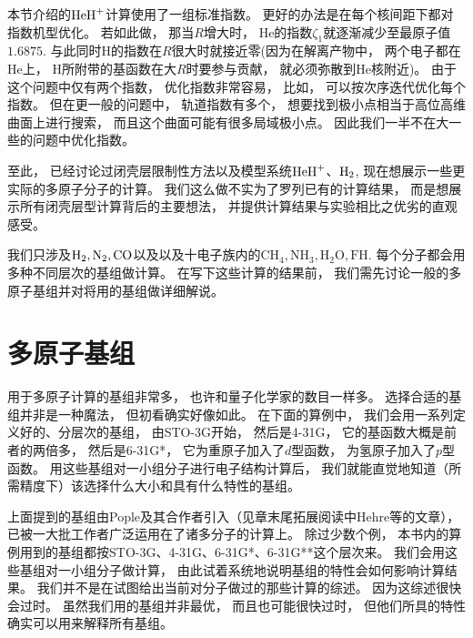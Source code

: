 
本节介绍的$\mathrm{HeH}^+$计算使用了一组标准指数。
更好的办法是在每个核间距下都对指数机型优化。
若如此做，
那当$R$增大时，
$\text{He}$的指数$\zeta_1$就逐渐减少至最原子值$1.6875$. 
与此同时$\text{H}$的指数在$R$很大时就接近零(因为在解离产物中，
两个电子都在$\text{He}$上，
$\text{H}$所附带的基函数在大$R$时要参与贡献，
就必须弥散到$\text{He}$核附近)。
由于这个问题中仅有两个指数，
优化指数非常容易，
比如，
可以按次序迭代优化每个指数。
但在更一般的问题中，
轨道指数有多个，
想要找到极小点相当于高位高维曲面上进行搜索，
而且这个曲面可能有很多局域极小点。
因此我们一半不在大一些的问题中优化指数。


至此，
已经讨论过闭壳层限制性\hft 方法以及模型系统$\mathrm{HeH}^+$、$\mathrm{H}_2$, 
现在想展示一些更实际的多原子分子的计算。
我们这么做不实为了罗列已有的计算结果，
而是想展示所有闭壳层\hft 型计算背后的主要想法，
并提供计算结果与实验相比之优劣的直观感受。


我们只涉及$\mathrm{H}_2, \text{N}_2, \text{CO}$以及以及十电子族内的$\text{CH}_4, \text{NH}_3, \text{H}_2\text{O}, \text{FH}$.
每个分子都会用多种不同层次的基组做计算。
在写下这些计算的结果前，
我们需先讨论一般的多原子基组并对将用的基组做详细解说。


\section{多原子基组}
用于多原子计算的基组非常多，
也许和量子化学家的数目一样多。
选择合适的基组并非是一种魔法，
但初看确实好像如此。
在下面的算例中，
我们会用一系列定义好的、分层次的基组，
由STO-3G开始，
然后是4-31G，
它的基函数大概是前者的两倍多，
然后是6-31G*，
它为重原子加入了$d$型函数，
为氢原子加入了$p$型函数。
用这些基组对一小组分子进行电子结构计算后，
我们就能直觉地知道（所需精度下）该选择什么大小和具有什么特性的基组。


上面提到的基组由Pople及其合作者引入（见章末尾拓展阅读中Hehre等的文章），
已被一大批工作者广泛运用在了诸多分子的计算上。
除过少数个例，
本书内的算例用到的基组都按STO-3G、4-31G、6-31G*、6-31G**这个层次来。
我们会用这些基组对一小组分子做计算，
由此试着系统地说明基组的特性会如何影响计算结果。
我们并不是在试图给出当前对分子做过的那些计算的综述。
因为这综述很快会过时。
虽然我们用的基组并非最优，
而且也可能很快过时，
但他们所具的特性确实可以用来解释所有基组。


